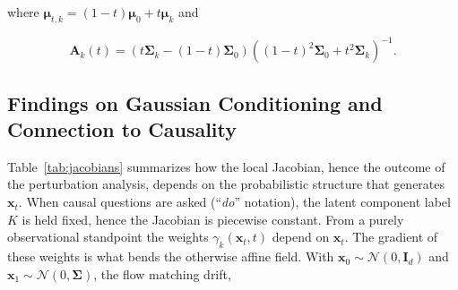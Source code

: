 where $\boldsymbol{\mu}_{t,k} = (1-t) \boldsymbol{\mu}_0 + t \boldsymbol{\mu}_k$ and

\begin{equation*}
\mathbf{A}_k(t) = \left(t \boldsymbol{\Sigma}_k - (1-t) \boldsymbol{\Sigma}_0\right) \left((1-t)^2 \boldsymbol{\Sigma}_0 + t^2 \boldsymbol{\Sigma}_k \right)^{-1}.
\end{equation*}

\subsection{Findings on Gaussian Conditioning and Connection to Causality}
\label{subsec:gaussian_condition}

\begin{table}[h]
    \centering
    \caption{Local Jacobians in three generative regimes. Intervention: we nudge the latent while holding the component label $K$ fixed. Observation: we only watch $\mathbf x_t$, so the posterior responsibilities $\gamma_k$ vary with $\mathbf x_t$.}
    \label{tab:jacobians}
\end{table}

Table~\ref{tab:jacobians} summarizes how the local Jacobian, hence the outcome of the perturbation analysis, depends on the probabilistic structure that generates $\mathbf x_t$. When causal questions are asked (``\emph{do}'' notation), the latent component label $K$ is held fixed, hence the Jacobian is piecewise constant. From a purely observational standpoint the weights $\gamma_k(\mathbf x_t,t)$ depend on $\mathbf x_t$. The gradient of these weights is what bends the otherwise affine field. With $\mathbf x_0 \sim \mathcal N(0, \mathbf{I}_d)$ and $\mathbf x_1 \sim \mathcal N(0, \boldsymbol\Sigma)$, the flow matching drift,

